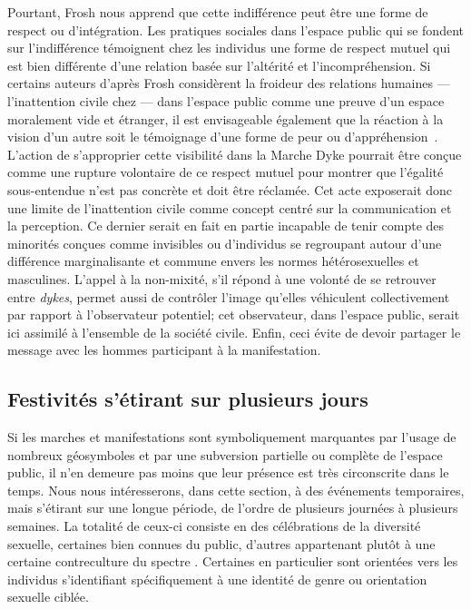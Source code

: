 Pourtant, Frosh nous apprend que cette indifférence peut être une forme de respect ou d'intégration.
Les pratiques sociales dans l'espace public qui se fondent sur l'indifférence témoignent chez les individus une forme de respect mutuel qui est bien différente d'une relation basée sur l'altérité et l'incompréhension.
Si certains auteurs d'après Frosh considèrent la froideur des relations humaines --- l'inattention civile chez \citet{Goffman1956} --- dans l'espace public comme une preuve d'un espace moralement vide et étranger, il est envisageable également que la réaction à la vision d'un autre soit le témoignage d'une forme de peur ou d'appréhension~\citep[279--280]{Frosh2006}.
L'action de s'approprier cette visibilité dans la Marche Dyke pourrait être conçue comme une rupture volontaire de ce respect mutuel pour montrer que l'égalité sous-entendue n'est pas concrète et doit être réclamée.
Cet acte exposerait donc une limite de l'inattention civile comme concept centré sur la communication et la perception.
Ce dernier serait en fait en partie incapable de tenir compte des minorités conçues comme invisibles ou d'individus se regroupant autour d'une différence marginalisante et commune envers les normes hétérosexuelles et masculines.
L'appel à la non-mixité, s'il répond à une volonté de se retrouver entre \emph{dykes}, permet aussi de contrôler l'image qu'elles véhiculent collectivement par rapport à l'observateur potentiel; cet observateur, dans l'espace public, serait ici assimilé à l'ensemble de la société civile.
Enfin, ceci évite de devoir partager le message avec les hommes participant à la manifestation.


\subsection{Festivités s'étirant sur plusieurs jours}
\label{sec:festivitesplusieursjours}

Si les marches et manifestations sont symboliquement marquantes par l'usage de nombreux géosymboles et par une subversion partielle ou complète de l'espace public, il n’en demeure pas moins que leur présence est très circonscrite dans le temps.
Nous nous intéresserons, dans cette section, à des événements temporaires, mais s'étirant sur une longue période, de l'ordre de plusieurs journées à plusieurs semaines.
La totalité de ceux-ci consiste en des célébrations de la diversité sexuelle, certaines bien connues du public, d'autres appartenant plutôt à une certaine contreculture du spectre \lgbt.
Certaines en particulier sont orientées vers les individus s'identifiant spécifiquement à une identité de genre ou orientation sexuelle ciblée.

